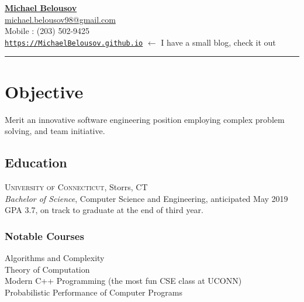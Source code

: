 \documentclass[Letterpaper,11pt]{article}
\begin{document}
\setlength{\parindent}{0em}
\setlength{\parskip}{1em}
\setlength{\parsep}{1em}
\setlength{\itemsep}{0.2em}
\setlength{\headsep}{0.2em}
\setlength{\topskip}{0.2em}
\setlength{\topmargin}{0.2em}
\setlength{\topsep}{0.2em}
\setlength{\partopsep}{0.2em}
\setlength{\columnsep}{1em}

\addtolength{\topmargin}{-4em}

\textbf{\href{mailto:michael.belousov98@gmail.com}{\Large Michael Belousov}}\\
\href{mailto:michael.belousov98@gmail.com}{michael.belousov98@gmail.com}\\
Mobile : (203) 502-9425\\
\href{https://MichaelBelousov.github.io/}{\texttt{https://MichaelBelousov.github.io}} $\gets$ I have a small blog, check it out\\
\hrule
\vspace{1em} %

\section*{Objective}

Merit an innovative software engineering position employing complex problem solving, and team initiative.


\vspace{-1em} %
\begin{multicols}{2}

    \section*{Education}

        \textsc{University of Connecticut}, Storrs, CT\\
        \textit{Bachelor of Science}, Computer Science and Engineering, anticipated May 2019\\
        GPA 3.7, on track to graduate at the end of third year.
    
    \subsubsection*{Notable Courses}
    
        Algorithms and Complexity\\
        Theory of Computation\\
        Modern C++ Programming (the most fun CSE class at UCONN) \\
        Probabilistic Performance of Computer Programs
        
\end{multicols}
\end{document}

